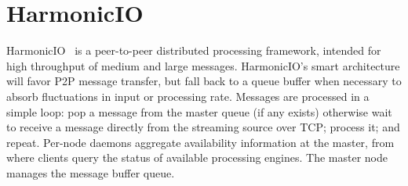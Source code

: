 \documentclass[letterpaper,conference]{IEEEtran}
\begin{document}



\section{HarmonicIO}

HarmonicIO~\cite{torruangwatthanaHarmonicIOScalableData2018a} is a peer-to-peer distributed processing framework, intended for high throughput of medium and large messages. 
HarmonicIO's smart architecture will favor P2P message transfer, but fall back to a queue buffer when necessary to absorb fluctuations in input or processing rate. Messages are processed in a simple loop: pop a message from the master queue (if any exists) otherwise wait to receive a message directly from the streaming source over TCP; process it; and repeat. Per-node daemons aggregate availability information at the master, from where clients query the status of available processing engines. The master node manages the message buffer queue.
\end{document}
